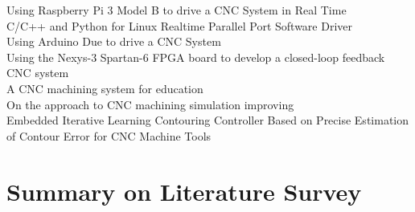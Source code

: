 \cite{FYP_Asyrul_2017} Using Raspberry Pi 3 Model B to drive a CNC System in Real Time\\
\cite{FYP_Abzal_2012} C/C++ and Python for Linux Realtime Parallel Port Software Driver\\
\cite{FYP_Hazmi_2014} Using Arduino Due to drive a CNC System\\
\cite{FYP_Charles_2014} Using the Nexys-3 Spartan-6 FPGA board to develop a closed-loop feedback CNC system\\
\cite{Education_1993} A CNC machining system for education\\
\cite{Kats_2017} On the approach to CNC machining simulation improving\\

\cite{Hendrawan_2018} Embedded Iterative Learning Contouring Controller Based on Precise Estimation of Contour Error for CNC Machine Tools\\

\section{Summary on Literature Survey}

